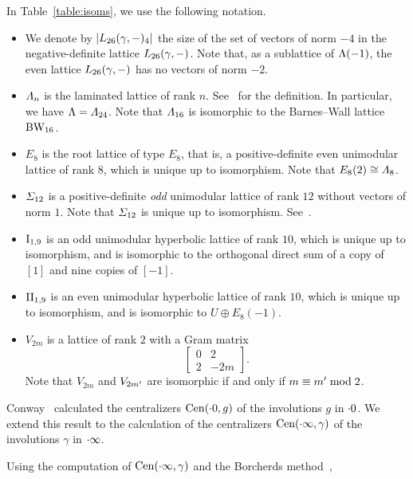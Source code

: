 \documentclass{amsart} %
\begin{document}
%
In Table~\ref{table:isoms}, we use the following notation.
\begin{itemize}
\item
We denote by $|L_{26}(\gamma, -)_4|$
the size of the set of vectors of norm $-4$ in the negative-definite lattice $L_{26}(\gamma, -)$.
Note that, as a sublattice of $\Lambda(-1)$, 
the even lattice $L_{26}(\gamma, -)$ has no vectors of norm $-2$.
\item 
$\varLambda_{n} $ is 
the laminated lattice of rank $n$. 
See~\cite[Chapter 6]{theCSbook} for the definition.
In particular, we have $\Lambda=\varLambda_{24}$.
Note that $\varLambda_{16}$ is isomorphic to the Barnes--Wall lattice $\mathrm{BW}_{16}$.
\item $E_8$ is the root lattice of type $E_8$, that is,
a positive-definite even unimodular lattice of rank $8$,
which is unique up to isomorphism.
Note that $E_8(2)\cong \varLambda_{8}$.
\item $\varSigma_{12}$ is 
a positive-definite \emph{odd} unimodular lattice of rank $12$
without vectors of norm $1$.
Note that $\varSigma_{12}$ is unique up to isomorphism.
See~\cite[Table 16.7]{theCSbook}.
\item $\mathrm{I}_{1,9}$ is an odd unimodular hyperbolic lattice of rank $10$, 
which is unique up to isomorphism,
and is isomorphic to the orthogonal direct sum of
 a copy of $[1]$ and nine copies of $[-1]$.
 \item $\mathrm{II}_{1,9}$ is an even unimodular hyperbolic lattice of rank $10$,
 which is unique up to isomorphism,
 and is isomorphic to $U\oplus E_8(-1)$.
\item $V_{2m}$ is a lattice of rank $2$
with a Gram matrix 
%
\begin{equation}\label{eq:GramVm}
\left[\begin{array}{cc} 0&2 \\ 2 & -2m \end{array}\right].
\end{equation}
%
Note that $V_{2m}$ and $V_{2m^{\prime}}$ are isomorphic 
if and only if $m\equiv m^{\prime} \bmod 2$.
\end{itemize}
%
\par
\medskip
Conway~\cite[Chapter 10]{theCSbook} calculated the centralizers $\mathrm{Cen}(\cdot 0, g)$
of the involutions $g$ in $\cdot 0$.
We extend this result to the calculation of the centralizers $\mathrm{Cen}(\cdot \infty, \gamma)$
of the involutions $\gamma$ in $\cdot \infty$.
\par
Using the computation of $\mathrm{Cen}(\cdot \infty, \gamma)$
and the Borcherds method~\cite{MR913200, MR1654763},
\end{document}
